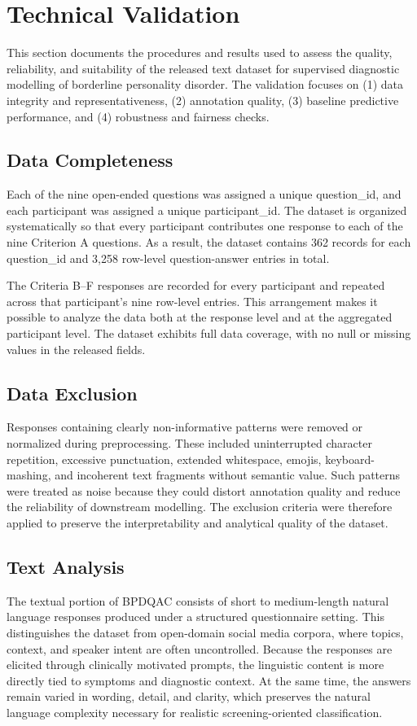 \documentclass{article}
\begin{document}
\section{Technical Validation}\label{sec6}
This section documents the procedures and results used to assess the quality, reliability, and suitability of the released text dataset for supervised diagnostic modelling of borderline personality disorder. The validation focuses on (1) data integrity and representativeness, (2) annotation quality, (3) baseline predictive performance, and (4) robustness and fairness checks.


\subsection{Data Completeness}
Each of the nine open-ended questions was assigned a unique question\_id, and each participant was assigned a unique participant\_id. The dataset is organized systematically so that every participant contributes one response to each of the nine Criterion A questions. As a result, the dataset contains 362 records for each question\_id and 3,258 row-level question-answer entries in total.

The Criteria B--F responses are recorded for every participant and repeated across that participant's nine row-level entries. This arrangement makes it possible to analyze the data both at the response level and at the aggregated participant level. The dataset exhibits full data coverage, with no null or missing values in the released fields.

\subsection{Data Exclusion}

Responses containing clearly non-informative patterns were removed or normalized during preprocessing. These included uninterrupted character repetition, excessive punctuation, extended whitespace, emojis, keyboard-mashing, and incoherent text fragments without semantic value. Such patterns were treated as noise because they could distort annotation quality and reduce the reliability of downstream modelling. The exclusion criteria were therefore applied to preserve the interpretability and analytical quality of the dataset.

\subsection{Text Analysis}
The textual portion of BPDQAC consists of short to medium-length natural language responses produced under a structured questionnaire setting. This distinguishes the dataset from open-domain social media corpora, where topics, context, and speaker intent are often uncontrolled. Because the responses are elicited through clinically motivated prompts, the linguistic content is more directly tied to symptoms and diagnostic context. At the same time, the answers remain varied in wording, detail, and clarity, which preserves the natural language complexity necessary for realistic screening-oriented classification.
\end{document}
